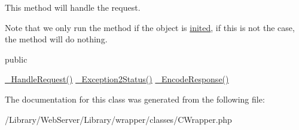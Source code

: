 This method will handle the request.

Note that we only run the method if the object is \hyperlink{class_c_status_object_a8429102e4f52f7558649b64f4e673a69}{inited}, if this is not the case, the method will do nothing.

public

\hyperlink{class_c_wrapper_a12c1dd1f1d1cf0ae889cc19ff17ced0e}{\-\_\-\-Handle\-Request()}  \hyperlink{class_c_wrapper_ad8dd05c155df0d8fe19be35d4bb67b56}{\-\_\-\-Exception2\-Status()}  \hyperlink{class_c_wrapper_a60583bacf329d484d01df9851602759f}{\-\_\-\-Encode\-Response()} 

The documentation for this class was generated from the following file\-:\begin{DoxyCompactItemize}
\item 
/\-Library/\-Web\-Server/\-Library/wrapper/classes/C\-Wrapper.\-php\end{DoxyCompactItemize}
